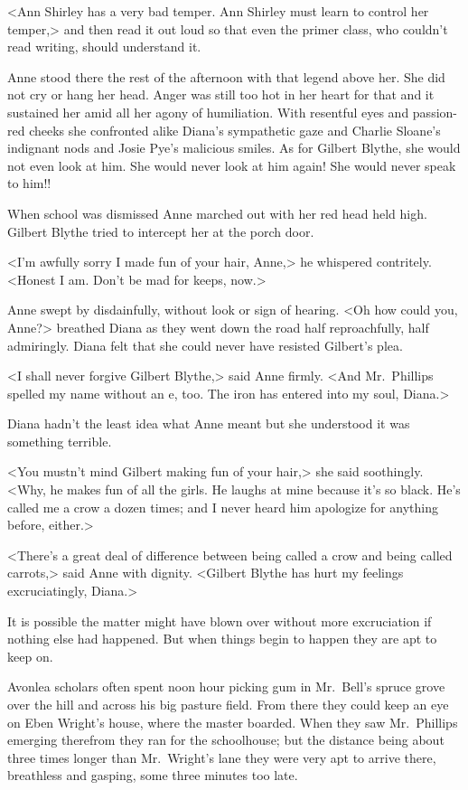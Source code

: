 <Ann Shirley has a very bad temper. Ann Shirley must learn to control her temper,> and then read it out loud so that even the primer class, who couldn't read writing, should understand it.

Anne stood there the rest of the afternoon with that legend above her. She did not cry or hang her head. Anger was still too hot in her heart for that and it sustained her amid all her agony of humiliation. With resentful eyes and passion-red cheeks she confronted alike Diana's sympathetic gaze and Charlie Sloane's indignant nods and Josie Pye's malicious smiles. As for Gilbert Blythe, she would not even look at him. She would never look at him again! She would never speak to him!!

When school was dismissed Anne marched out with her red head held high. Gilbert Blythe tried to intercept her at the porch door.

<I'm awfully sorry I made fun of your hair, Anne,> he whispered contritely. <Honest I am. Don't be mad for keeps, now.>

Anne swept by disdainfully, without look or sign of hearing. <Oh how could you, Anne?> breathed Diana as they went down the road half reproachfully, half admiringly. Diana felt that she could never have resisted Gilbert's plea.

<I shall never forgive Gilbert Blythe,> said Anne firmly. <And Mr.~Phillips spelled my name without an e, too. The iron has entered into my soul, Diana.>

Diana hadn't the least idea what Anne meant but she understood it was something terrible.

<You mustn't mind Gilbert making fun of your hair,> she said soothingly. <Why, he makes fun of all the girls. He laughs at mine because it's so black. He's called me a crow a dozen times; and I never heard him apologize for anything before, either.>

<There's a great deal of difference between being called a crow and being called carrots,> said Anne with dignity. <Gilbert Blythe has hurt my feelings excruciatingly, Diana.>

It is possible the matter might have blown over without more excruciation if nothing else had happened. But when things begin to happen they are apt to keep on.

Avonlea scholars often spent noon hour picking gum in Mr.~Bell's spruce grove over the hill and across his big pasture field. From there they could keep an eye on Eben Wright's house, where the master boarded. When they saw Mr.~Phillips emerging therefrom they ran for the schoolhouse; but the distance being about three times longer than Mr.~Wright's lane they were very apt to arrive there, breathless and gasping, some three minutes too late.

